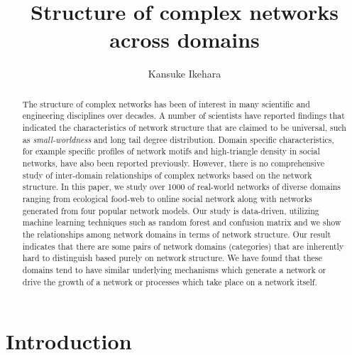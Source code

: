 \documentclass{article}
\begin{document}
\title{Structure of complex networks across domains}
\author{Kansuke Ikehara}
\maketitle

\begin{abstract}
The structure of complex networks has been of interest in many scientific and engineering disciplines over decades. A number of scientists have reported findings that indicated the characteristics of network structure that are claimed to be universal, such as \textit{small-worldness} and long tail degree distribution. Domain specific characteristics, for example specific profiles of network motifs and high-triangle density in social networks, have also been reported previously. However, there is no comprehensive study of inter-domain relationships of complex networks based on the network structure. In this paper, we study over 1000 of real-world networks of diverse domains ranging from ecological food-web to online social network along with networks generated from four popular network models. Our study is data-driven, utilizing machine learning techniques such as random forest and confusion matrix and we show the relationships among network domains in terms of network structure. Our result indicates that there are some pairs of network domains (categories) that are inherently hard to distinguish based purely on network structure. We have found that these domains tend to have similar underlying mechanisms which generate a network or drive the growth of a network or processes which take place on a network itself.
  
\end{abstract}
\tableofcontents

\newpage
\section{Introduction}
\end{document}
